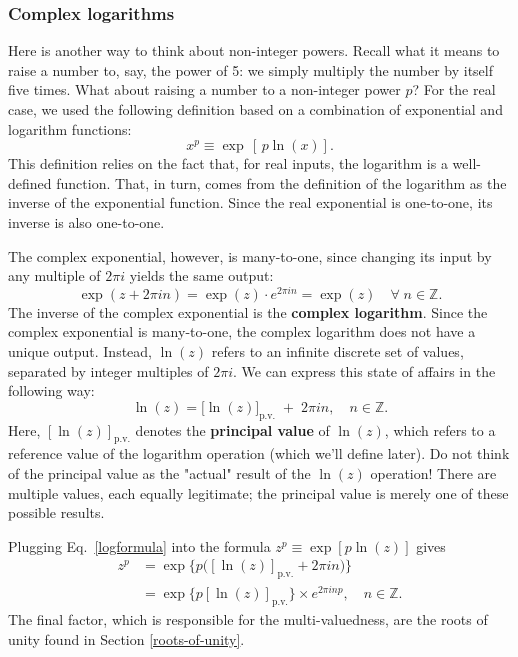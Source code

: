 \documentclass[10pt,a4paper]{article}
\begin{document}
\subsubsection{Complex logarithms}\label{complex-logarithms}

Here is another way to think about non-integer powers.  Recall what it
means to raise a number to, say, the power of 5: we simply multiply
the number by itself five times. What about raising a number to a
non-integer power $p$? For the real case, we used the following
definition based on a combination of exponential and logarithm
functions:
\begin{equation}
x^p \equiv \exp\,\left[\,p\ln(x)\right].
\end{equation}
This definition relies on the fact that, for real inputs, the
logarithm is a well-defined function. That, in turn, comes from the
definition of the logarithm as the inverse of the exponential
function. Since the real exponential is one-to-one, its inverse is
also one-to-one.

The complex exponential, however, is many-to-one, since changing its
input by any multiple of $2\pi i$ yields the same output:
\begin{equation}
\exp(z + 2\pi i n) = \exp(z) \cdot e^{2\pi i n} = \exp(z) \quad \forall\; n \in \mathbb{Z}.
\end{equation}
The inverse of the complex exponential is the \textbf{complex
logarithm}. Since the complex exponential is many-to-one, the complex
logarithm does not have a unique output. Instead, $\ln(z)$ refers to
an infinite discrete set of values, separated by integer multiples of
$2\pi i$. We can express this state of affairs in the following way:
\begin{equation}
\ln(z) = \big[\ln(z)\big]_{\mathrm{p.v.}}\; +\; 2 \pi i n, \quad n \in \mathbb{Z}.
\label{logformula}
\end{equation}
Here, $[\ln(z)]_{\mathrm{p.v.}}$ denotes the \textbf{principal value}
of $\ln(z)$, which refers to a reference value of the logarithm
operation (which we'll define later).  Do not think of the principal
value as the "actual" result of the $\ln(z)$ operation! There are
multiple values, each equally legitimate; the principal value is
merely one of these possible results.

Plugging Eq.~\eqref{logformula} into the formula $z^p \equiv
\exp\left[p\ln(z)\right]$ gives
\begin{align}
  z^p &= \exp\Big\{p\big([\ln(z)]_{\mathrm{p.v.}} + 2\pi i n\big)\Big\}\\
  &= \exp\Big\{p[\ln(z)]_{\mathrm{p.v.}}\Big\} \times e^{2\pi i np}, \quad n \in \mathbb{Z}.
\end{align}
The final factor, which is responsible for the multi-valuedness, are
the roots of unity found in Section \ref{roots-of-unity}.
\end{document}
